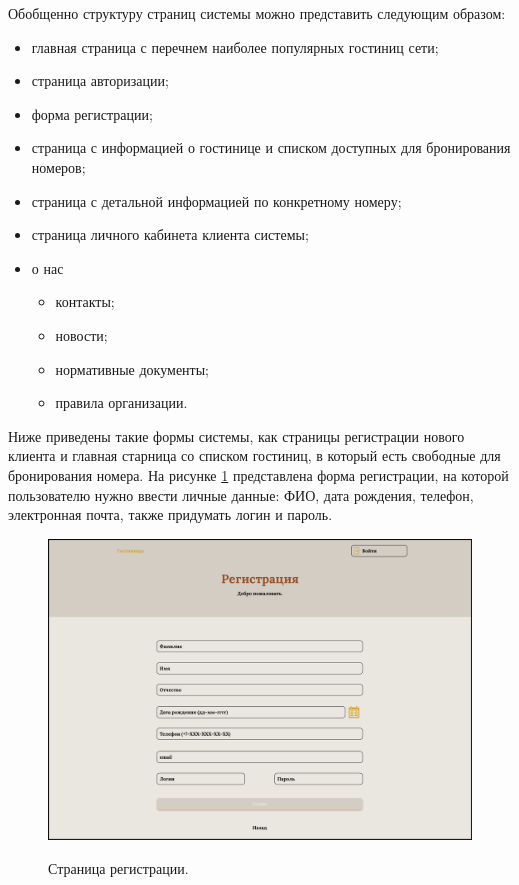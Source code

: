 Обобщенно структуру страниц системы можно представить следующим образом:
\begin{itemize}
	\item главная страница с перечнем наиболее популярных гостиниц сети;
	
	\item страница авторизации;
		
	\item форма регистрации;
	
	\item страница с информацией о гостинице и списком доступных для бронирования номеров;
	
	\item страница с детальной информацией по конкретному номеру;
	
	\item страница личного кабинета клиента системы;
	
	\item о нас
	\begin{itemize}
		\item контакты;
		
		\item новости;
		
		\item нормативные документы;
		
		\item правила организации.
	\end{itemize}
\end{itemize}

Ниже приведены такие формы системы, как страницы регистрации нового клиента и главная старница со списком гостиниц, в который есть свободные для бронирования номера. На рисунке \ref{fig:ui-reg} представлена форма регистрации, на которой пользователю нужно ввести личные данные: ФИО, дата рождения, телефон, электронная почта, также придумать логин и пароль. 

\begin{figure}[h]
	\begin{center}
		{\includegraphics[scale = 0.3]{img/ui/registration.pdf}}
		\caption{Страница регистрации.}
		\label{fig:ui-reg}
	\end{center}
\end{figure} 

